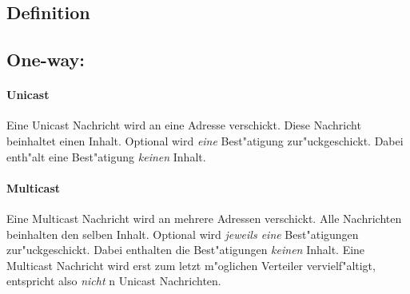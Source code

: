 \pagebreak

\subsection{Definition}
\label{subsec:mep-def}

\subsection*{One-way:}

\paragraph{Unicast}
Eine Unicast Nachricht wird an eine Adresse verschickt. Diese Nachricht beinhaltet einen Inhalt. Optional wird {\it eine} Best"atigung zur"uckgeschickt. Dabei enth"alt eine Best"atigung \emph{keinen} Inhalt.
\paragraph{Multicast}
Eine Multicast Nachricht wird an mehrere Adressen verschickt. Alle Nachrichten beinhalten den selben Inhalt. Optional wird {\it jeweils eine} Best"atigungen zur"uckgeschickt. Dabei enthalten die Best"atigungen \emph{keinen} Inhalt. Eine Multicast Nachricht wird erst zum letzt m"oglichen Verteiler vervielf"altigt, entspricht also \emph{nicht} n Unicast Nachrichten.

